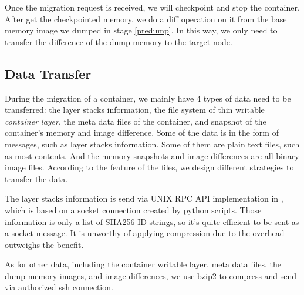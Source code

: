 Once the migration request is received, we will checkpoint and stop the container. After get the checkpointed memory, we do a diff operation on it from the base memory image we dumped in stage \ref{predump}. 
In this way, we only need to transfer the difference of the dump memory to the target node. 

\subsection{Data Transfer}\label{design:compression}

During the migration of a container, we mainly have 4 types of data need to be transferred:
the layer stacks information, the file system of thin writable \textit{container layer}, the meta data files of the container, and snapshot of the container's memory and image difference. Some of the data is in the form of messages, such as layer stacks information. Some of them are plain text files, such as most contents. And the memory snapshots and image differences are all binary image files. According to the feature of the files, we design different strategies to transfer the data.

The layer stacks information is send via UNIX RPC API implementation in \cite{phaul}, which is based on a socket connection created by python scripts. Those information is only a list of SHA256 ID strings, so it's quite efficient to be sent as a socket message. It is unworthy of applying compression due to the overhead outweighs the benefit.

As for other data, including the container writable layer, meta data files, the dump memory images, and image differences, we use bzip2 to compress and send via authorized ssh connection.




